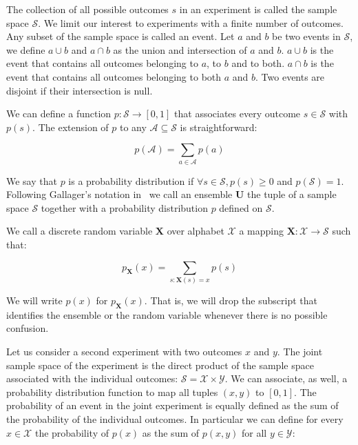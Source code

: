 The collection of all possible outcomes $s$ in an experiment is called the sample space $\mathcal{S}$. We limit our interest to experiments with a finite number of outcomes. Any subset of the sample space is called an event. Let $a$ and $b$ be two events in $\mathcal{S}$, we define $a\cup b$ and $a\cap b$ as the union and intersection of $a$ and $b$. $a\cup b$ is the event that contains all outcomes belonging to $a$, to $b$ and to both. $a\cap b$ is the event that contains all outcomes belonging to both $a$ and $b$. Two events are disjoint if their intersection is null.

We can define a function $p: \mathcal{S}\rightarrow [0,1]$ that associates every outcome $s\in \mathcal{S}$ with $p(s)$. The extension of $p$ to any $\mathcal{A}\subseteq \mathcal{S}$ is straightforward:

\begin{equation}
p(\mathcal{A})=\sum_{a\in \mathcal{A}}p(a)
\end{equation} 

We say that $p$ is a probability distribution if $\forall s\in \mathcal{S}, p(s)\geq 0$ and $p(\mathcal{S})=1$. Following Gallager's notation in~\cite{Gallager_68} we call an ensemble $\mathbf U$ the tuple of a sample space $\mathcal S$ together with a probability distribution $p$ defined on $\mathcal S$.

We call a discrete random variable $\mathbf{X}$ over alphabet $\mathcal{X}$ a mapping $\mathbf{X}:\mathcal{X}\rightarrow \mathcal{S}$ such that:

\begin{equation}
p_\mathbf{X}(x)=\sum_{s:\mathbf{X}(s)=x}p(s)
\end{equation} 

We will write $p(x)$ for $p_\mathbf{X}(x)$. That is, we will drop the subscript that identifies the ensemble or the random variable whenever there is no possible confusion. 

Let us consider a second experiment with two outcomes $x$ and $y$. The joint sample space of the experiment is the direct product of the sample space associated with the individual outcomes: $\mathcal S = \mathcal X \times \mathcal Y$. We can associate, as well, a probability distribution function to map all tuples $(x,y)$ to $[0,1]$. The probability of an event in the joint experiment is equally defined as the sum of the probability of the individual outcomes. In particular we can define for every $x\in\mathcal X$ the probability of $p(x)$ as the sum of $p(x,y)$ for all $y\in\mathcal Y$:

